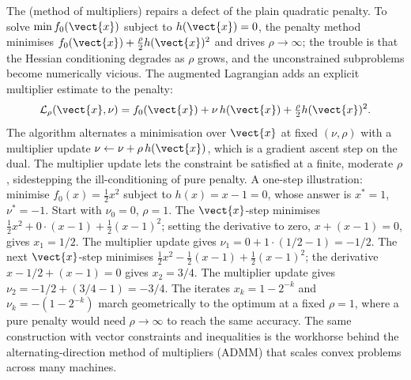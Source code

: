 The  (method of multipliers) repairs
a defect of the plain quadratic penalty. To solve $\min f_{0}
(\vect{x})$ subject to $h(\vect{x}) = 0$, the penalty method
minimises $f_{0}(\vect{x}) + \tfrac{\rho}{2} h(\vect{x})^{2}$ and
drives $\rho \to \infty$; the trouble is that the Hessian
conditioning degrades as $\rho$ grows, and the unconstrained
subproblems become numerically vicious. The augmented Lagrangian
adds an explicit multiplier estimate to the penalty:
\[
\mathcal{L}_{\rho}(\vect{x}, \nu) = f_{0}(\vect{x}) + \nu \,
h(\vect{x}) + \tfrac{\rho}{2} h(\vect{x})^{2}.
\]
The algorithm alternates a minimisation over $\vect{x}$ at fixed
$(\nu, \rho)$ with a multiplier update $\nu \leftarrow \nu + \rho \,
h(\vect{x})$, which is a gradient ascent step on the dual. The
multiplier update lets the constraint be satisfied at a finite,
moderate $\rho$, sidestepping the ill-conditioning of pure penalty.
A one-step illustration: minimise $f_{0}(x) = \tfrac{1}{2} x^{2}$
subject to $h(x) = x - 1 = 0$, whose answer is $x^{*} = 1$, $\nu^{*}
= -1$. Start with $\nu_{0} = 0$, $\rho = 1$. The $\vect{x}$-step
minimises $\tfrac{1}{2} x^{2} + 0 \cdot (x - 1) + \tfrac{1}{2}(x -
1)^{2}$; setting the derivative to zero, $x + (x - 1) = 0$, gives
$x_{1} = 1/2$. The multiplier update gives $\nu_{1} = 0 + 1 \cdot
(1/2 - 1) = -1/2$. The next $\vect{x}$-step minimises $\tfrac{1}{2}
x^{2} - \tfrac{1}{2}(x - 1) + \tfrac{1}{2}(x - 1)^{2}$; the
derivative $x - 1/2 + (x - 1) = 0$ gives $x_{2} = 3/4$. The
multiplier update gives $\nu_{2} = -1/2 + (3/4 - 1) = -3/4$. The
iterates $x_{k} = 1 - 2^{-k}$ and $\nu_{k} = -(1 - 2^{-k})$ march
geometrically to the optimum at a fixed $\rho = 1$, where a pure
penalty would need $\rho \to \infty$ to reach the same accuracy.
The same construction with vector constraints and inequalities is
the workhorse behind the alternating-direction method of
multipliers (ADMM) that scales convex problems across many machines.

